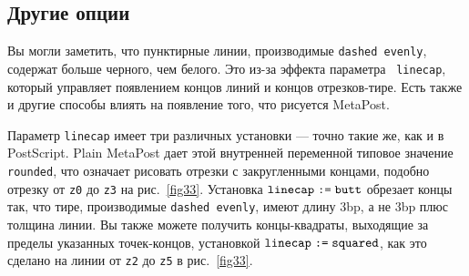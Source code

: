 \documentclass{article} %
\begin{document}
\subsection{Другие опции}
\label{oopt}

Вы могли заметить, что пунктирные линии, производимые 
{\tt dashed evenly}, содержат 
больше черного, чем белого.
Это из-за эффекта параметра {\tt
linecap}\label{Dlinecap}, который 
управляет появлением концов линий и концов отрезков-тире.
Есть также и другие способы влиять на появление того, что рисуется 
MetaPost.

Параметр {\tt linecap} имеет три различных установки --- точно такие же, 
как и в PostScript.
Plain MetaPost дает этой внутренней переменной типовое значение {\tt
rounded}, что означает рисовать 
отрезки с закругленными концами, подобно отрезку от 
{\tt z0} до {\tt z3} на рис.~\ref{fig33}. 
Установка ${\tt linecap}\mathrel{\hbox{\tt:=}}{\tt
butt}$\label{Dbutt} обрезает концы так, что 
тире, производимые {\tt dashed
evenly}, имеют длину 3bp, а не 3bp плюс 
толщина линии. 
Вы также можете получить концы-квадраты, выходящие за пределы указанных 
точек-концов, установкой ${\tt linecap}\mathrel{\hbox{\tt:=}}{\tt
squared}$\label{Dsqred}, как это сделано 
на линии от {\tt z2} до {\tt z5} в рис.~\ref{fig33}.
\end{document}
